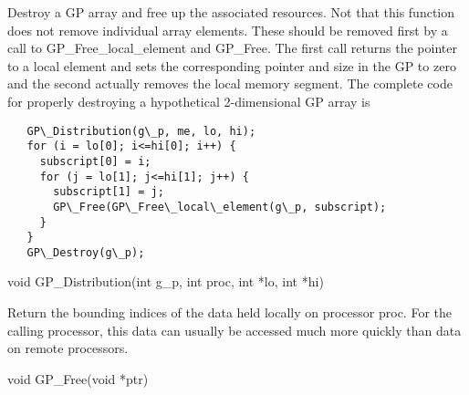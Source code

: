 \documentclass[12pt]{article}
\begin{document}
\local

\begin{desc}

Destroy a GP array and free up the associated resources. Not that this function
does not remove individual array elements. These should be removed first by a
call to GP\_Free\_local\_element and GP\_Free. The first call returns the pointer to
a local element and sets the corresponding pointer and size in the GP to zero
and the second actually removes the local memory segment. The complete code for
properly destroying a hypothetical 2-dimensional GP array is

\begin{verbatim}
   GP\_Distribution(g\_p, me, lo, hi);
   for (i = lo[0]; i<=hi[0]; i++) {
     subscript[0] = i;
     for (j = lo[1]; j<=hi[1]; j++) {
       subscript[1] = j;
       GP\_Free(GP\_Free\_local\_element(g\_p, subscript);
     }
   }
   GP\_Destroy(g\_p);
\end{verbatim}

\end{desc}



\begin{capi}
\begin{ccode}
void GP\_Distribution(int g\_p, int proc, int *lo, int *hi)
\begin{funcargs}
\end{funcargs}
\end{ccode}
\end{capi}

\local

\begin{desc}

Return the bounding indices of the data held locally on processor proc. For the
calling processor, this data can usually be accessed much more quickly than data
on remote processors.

\end{desc}


\begin{capi}
\begin{ccode}
void GP\_Free(void *ptr)
\begin{funcargs}
\end{funcargs}
\end{ccode}
\end{capi}
\end{document}
